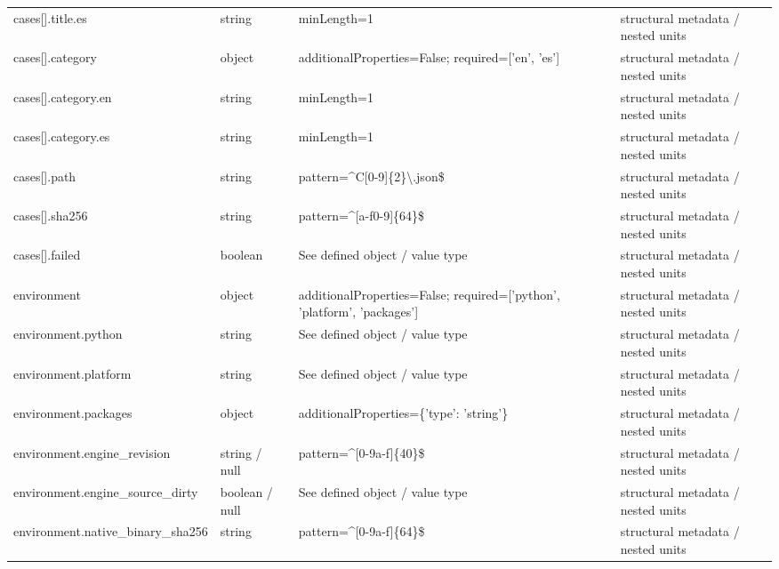 \begin{longtable}{@{}>{\raggedright\arraybackslash}p{}>{\raggedright\arraybackslash}p{}>{\raggedright\arraybackslash}p{}>{\raggedright\arraybackslash}p{}@{}}
cases[].\allowbreak{}title.\allowbreak{}es & string & minLength=\allowbreak{}1 & structural metadata /\allowbreak{} nested units\\
cases[].\allowbreak{}category & object & additionalProperties=\allowbreak{}False; required=\allowbreak{}['en', 'es'] & structural metadata /\allowbreak{} nested units\\
cases[].\allowbreak{}category.\allowbreak{}en & string & minLength=\allowbreak{}1 & structural metadata /\allowbreak{} nested units\\
cases[].\allowbreak{}category.\allowbreak{}es & string & minLength=\allowbreak{}1 & structural metadata /\allowbreak{} nested units\\
cases[].\allowbreak{}path & string & pattern=\allowbreak{}\textasciicircum{}C[0-9]\{2\}\textbackslash{}.\allowbreak{}json\$ & structural metadata /\allowbreak{} nested units\\
cases[].\allowbreak{}sha256 & string & pattern=\allowbreak{}\textasciicircum{}[a-\allowbreak{}f0-9]\{64\}\$ & structural metadata /\allowbreak{} nested units\\
cases[].\allowbreak{}failed & boolean & See defined object /\allowbreak{} value type & structural metadata /\allowbreak{} nested units\\
environment & object & additionalProperties=\allowbreak{}False; required=\allowbreak{}['python', 'platform', 'packages'] & structural metadata /\allowbreak{} nested units\\
environment.\allowbreak{}python & string & See defined object /\allowbreak{} value type & structural metadata /\allowbreak{} nested units\\
environment.\allowbreak{}platform & string & See defined object /\allowbreak{} value type & structural metadata /\allowbreak{} nested units\\
environment.\allowbreak{}packages & object & additionalProperties=\allowbreak{}\{'type': 'string'\} & structural metadata /\allowbreak{} nested units\\
environment.\allowbreak{}engine\_\allowbreak{}revision & string /\allowbreak{} null & pattern=\allowbreak{}\textasciicircum{}[0-9a-\allowbreak{}f]\{40\}\$ & structural metadata /\allowbreak{} nested units\\
environment.\allowbreak{}engine\_\allowbreak{}source\_\allowbreak{}dirty & boolean /\allowbreak{} null & See defined object /\allowbreak{} value type & structural metadata /\allowbreak{} nested units\\
environment.\allowbreak{}native\_\allowbreak{}binary\_\allowbreak{}sha256 & string & pattern=\allowbreak{}\textasciicircum{}[0-9a-\allowbreak{}f]\{64\}\$ & structural metadata /\allowbreak{} nested units\\

\end{longtable}
